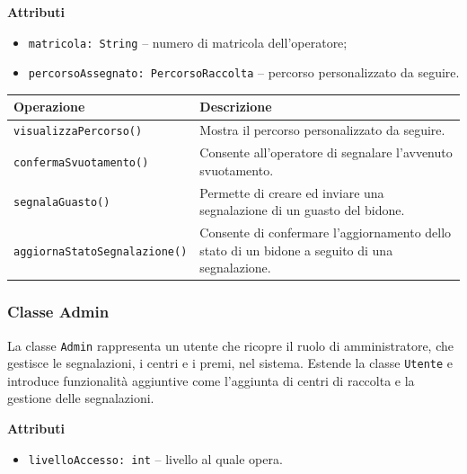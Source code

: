 \documentclass[12pt,a4paper]{article}
\begin{document}
\textbf{Attributi}
\begin{itemize}
    \item \texttt{matricola: String} -- numero di matricola dell'operatore;
    \item \texttt{percorsoAssegnato: \texttt{PercorsoRaccolta}} -- percorso personalizzato da seguire.
\end{itemize}

\begin{table}[H]
\centering
\begin{tabularx}{\textwidth}{@{}lX@{}}
\toprule
\textbf{Operazione} & \textbf{Descrizione} \\ \midrule
\texttt{visualizzaPercorso()} & Mostra il percorso personalizzato da seguire. \\
\texttt{confermaSvuotamento()} & Consente all'operatore di segnalare l'avvenuto svuotamento. \\
\texttt{segnalaGuasto()} & Permette di creare ed inviare una segnalazione di un guasto del bidone. \\
\texttt{aggiornaStatoSegnalazione()} & Consente di confermare l'aggiornamento dello stato di un bidone a seguito di una segnalazione. \\
\end{tabularx}
\end{table}

\subsubsection{Classe Admin}
La classe \texttt{Admin} rappresenta un utente che ricopre il ruolo di amministratore, che gestisce le segnalazioni, i centri e i premi, nel sistema. 
Estende la classe \texttt{Utente} e introduce funzionalità aggiuntive come l'aggiunta di centri di raccolta e la gestione delle segnalazioni.

\textbf{Attributi}
\begin{itemize}
    \item \texttt{livelloAccesso: int} -- livello al quale opera.
\end{itemize}
\end{document}
